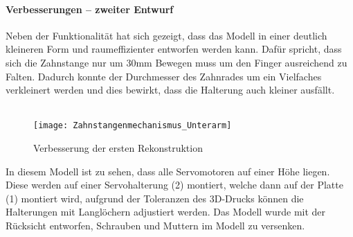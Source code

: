\documentclass[titlepage,12pt,twoside]{article}
\begin{document}
\paragraph{Verbesserungen – zweiter Entwurf}
\hfill \break
\hfill \break
Neben der Funktionalität hat sich gezeigt, dass das Modell in einer deutlich kleineren Form und raumeffizienter entworfen werden kann. Dafür spricht, dass sich die Zahnstange nur um 30mm Bewegen muss um den Finger ausreichend zu Falten. 
Dadurch konnte der Durchmesser des Zahnrades um ein Vielfaches verkleinert werden und dies bewirkt, dass die Halterung auch kleiner ausfällt. \\
\\
\begin{figure}[H]
	\begin{center}
		\scalebox{1}
		{\texttt{[image: Zahnstangenmechanismus\_Unterarm]}}
		\caption{Verbesserung der ersten Rekonstruktion}
		\label{fig:Zahnstangenmechanismus_Unterarm}			
	\end{center}
\end{figure}
\hfill \break
In diesem Modell ist zu sehen, dass alle Servomotoren auf einer Höhe liegen. Diese werden auf einer Servohalterung (2) montiert, welche dann auf der Platte (1) montiert wird, aufgrund der Toleranzen des 3D-Drucks können die Halterungen mit 
Langlöchern adjustiert werden. Das Modell wurde mit der Rücksicht entworfen, Schrauben und Muttern im Modell zu versenken. \\
\\
\end{document}
